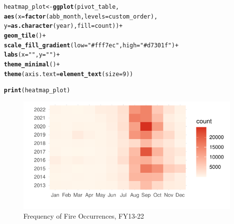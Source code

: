 \documentclass{article}\usepackage[]{graphicx}\usepackage[]{xcolor}
\makeatletter
\def\maxwidth{ %
  \ifdim\Gin@nat@width>\linewidth
    \linewidth
  \else
    \Gin@nat@width
  \fi
}
\newcommand{\hlnum}[1]{\textcolor[rgb]{0.686,0.059,0.569}{#1}}%
\newcommand{\hlstr}[1]{\textcolor[rgb]{0.192,0.494,0.8}{#1}}%
\newcommand{\hlopt}[1]{\textcolor[rgb]{0,0,0}{#1}}%
\newcommand{\hlstd}[1]{\textcolor[rgb]{0.345,0.345,0.345}{#1}}%
\newcommand{\hlkwb}[1]{\textcolor[rgb]{0.69,0.353,0.396}{#1}}%
\newcommand{\hlkwc}[1]{\textcolor[rgb]{0.333,0.667,0.333}{#1}}%
\newcommand{\hlkwd}[1]{\textcolor[rgb]{0.737,0.353,0.396}{\textbf{#1}}}%
\newenvironment{kframe}{%
 \def\at@end@of@kframe{}%
 \ifinner\ifhmode%
  \def\at@end@of@kframe{\end{minipage}}%
  \begin{minipage}{\columnwidth}%
 \fi\fi%
 \def\FrameCommand##1{\hskip\@totalleftmargin \hskip-\fboxsep
 \colorbox{shadecolor}{##1}\hskip-\fboxsep
     \hskip-\linewidth \hskip-\@totalleftmargin \hskip\columnwidth}%
 \MakeFramed {\advance\hsize-\width
   \@totalleftmargin\z@ \linewidth\hsize
   \@setminipage}}%
 {\par\unskip\endMakeFramed%
 \at@end@of@kframe}
\newenvironment{knitrout}{}{} %
\makeatother
\begin{document}
\begin{knitrout}
\color{fgcolor}\begin{kframe}
\begin{alltt}
\hlstd{heatmap_plot} \hlkwb{<-} \hlkwd{ggplot}\hlstd{(pivot_table,}
                       \hlkwd{aes}\hlstd{(}\hlkwc{x} \hlstd{=} \hlkwd{factor}\hlstd{(abb_month,} \hlkwc{levels} \hlstd{= custom_order),}
                           \hlkwc{y} \hlstd{=} \hlkwd{as.character}\hlstd{(year),} \hlkwc{fill} \hlstd{= count))} \hlopt{+}
  \hlkwd{geom_tile}\hlstd{()} \hlopt{+}
  \hlkwd{scale_fill_gradient}\hlstd{(}\hlkwc{low} \hlstd{=} \hlstr{"#fff7ec"}\hlstd{,} \hlkwc{high} \hlstd{=} \hlstr{"#d7301f"}\hlstd{)} \hlopt{+}
  \hlkwd{labs}\hlstd{(}\hlkwc{x} \hlstd{=} \hlstr{" "}\hlstd{,} \hlkwc{y} \hlstd{=} \hlstr{" "}\hlstd{)} \hlopt{+}
  \hlkwd{theme_minimal}\hlstd{()} \hlopt{+}
  \hlkwd{theme}\hlstd{(}\hlkwc{axis.text} \hlstd{=} \hlkwd{element_text}\hlstd{(}\hlkwc{size} \hlstd{=} \hlnum{9}\hlstd{))}

\hlkwd{print}\hlstd{(heatmap_plot)}
\end{alltt}
\end{kframe}\begin{figure}
\includegraphics[width=\maxwidth]{figure/fire-by-months-fy13-22-1} \caption[Frequency of Fire Occurrences, FY13-22]{Frequency of Fire Occurrences, FY13-22}\label{fig:fire-by-months-fy13-22}
\end{figure}

\end{knitrout}
\end{document}
